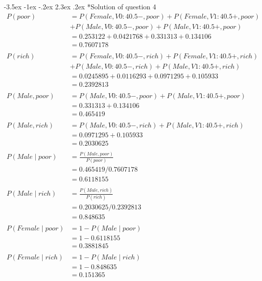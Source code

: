 \documentclass[12pt]{article}
\makeatletter
\renewcommand\section{\@startsection {section}{1}{\z@}%
	{-3.5ex \@plus -1ex \@minus -.2ex}%
	{2.3ex \@plus.2ex}%
	{\normalfont\large\bfseries}}%
\makeatother
\begin{document}
	\section*{Solution of question 4}
	\begin{equation*}
	\begin{aligned}
		P(poor) &= P(Female, V0:40.5-, poor)+P(Female, V1:40.5+, poor)\\
		&+P(Male, V0:40.5-, poor)+P(Male, V1:40.5+, poor)\\
		&=0.253122+0.0421768+0.331313+0.134106\\
		&=0.7607178\\
		\\
		P(rich) &= P(Female, V0:40.5-, rich)+P(Female, V1:40.5+, rich)\\
		&+P(Male, V0:40.5-, rich)+P(Male, V1:40.5+, rich)\\
		&=0.0245895+0.0116293+0.0971295+0.105933\\
		&=0.2392813\\
		\\
		P(Male,poor) &= P(Male, V0:40.5-, poor)+P(Male, V1:40.5+, poor)\\
		&=0.331313+0.134106\\
		&=0.465419\\
		\\
		P(Male,rich) &= P(Male, V0:40.5-, rich)+P(Male, V1:40.5+, rich)\\
		&=0.0971295+0.105933\\
		&=0.2030625\\
		\\
		P(Male\mid poor) &= \frac{P(Male, poor)}{P(poor)}\\
		&=0.465419/0.7607178\\
		&=0.6118155\\
		\\
		P(Male\mid rich) &= \frac{P(Male, rich)}{P(rich)}\\
		&=0.2030625/0.2392813\\
		&=0.848635\\
		\\
		P(Female\mid poor) &= 1-P(Male\mid poor)\\
		&=1-0.6118155\\
		&=0.3881845\\
		\\
		P(Female\mid rich) &= 1-P(Male\mid rich)\\
		&=1-0.848635\\
		&=0.151365
	\end{aligned}
	\end{equation*}
	
	
\end{document}
